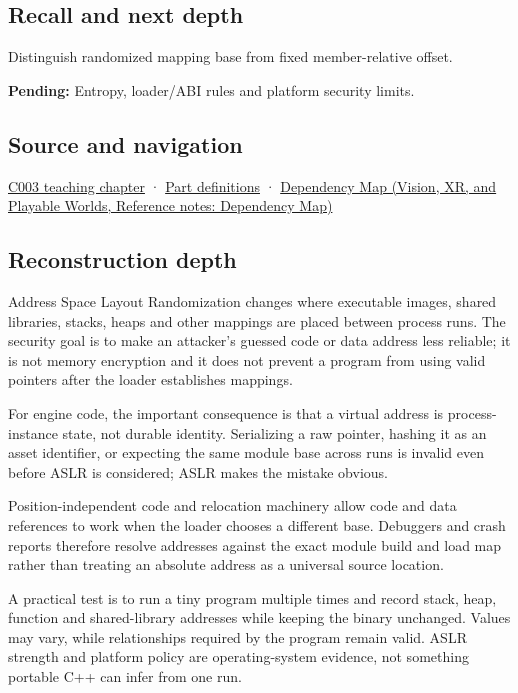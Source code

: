 \subsection{Recall and next depth}\label{appendix-78cb248c8355-recall-and-next-depth}

\hypertarget{appendix-78cb248c8355-recall-and-next-depth}{}

Distinguish randomized mapping base from fixed member-relative offset.

\textbf{Pending:} Entropy, loader/ABI rules and platform security limits.

\subsection{Source and navigation}\label{appendix-78cb248c8355-source-and-navigation}

\hypertarget{appendix-78cb248c8355-source-and-navigation}{}

\hyperref[01-foundations-i-ch002-where-the-bytes-live]{C003 teaching chapter} · \hyperref[appendix-fd090d982a15-m003---parts-41-60]{Part definitions} · \href{../07-Vision-XR-and-Playable-Worlds/main.pdf\#nameddest=appendix-4ad47bdd269a}{Dependency Map (Vision, XR, and Playable Worlds, Reference notes: Dependency Map)}

\subsection{Reconstruction depth}\label{appendix-78cb248c8355-reconstruction-depth}

\hypertarget{appendix-78cb248c8355-reconstruction-depth}{}

Address Space Layout Randomization changes where executable images, shared libraries, stacks, heaps and other mappings are placed between process runs. The security goal is to make an attacker's guessed code or data address less reliable; it is not memory encryption and it does not prevent a program from using valid pointers after the loader establishes mappings.

For engine code, the important consequence is that a virtual address is process-instance state, not durable identity. Serializing a raw pointer, hashing it as an asset identifier, or expecting the same module base across runs is invalid even before ASLR is considered; ASLR makes the mistake obvious.

Position-independent code and relocation machinery allow code and data references to work when the loader chooses a different base. Debuggers and crash reports therefore resolve addresses against the exact module build and load map rather than treating an absolute address as a universal source location.

A practical test is to run a tiny program multiple times and record stack, heap, function and shared-library addresses while keeping the binary unchanged. Values may vary, while relationships required by the program remain valid. ASLR strength and platform policy are operating-system evidence, not something portable C++ can infer from one run.

